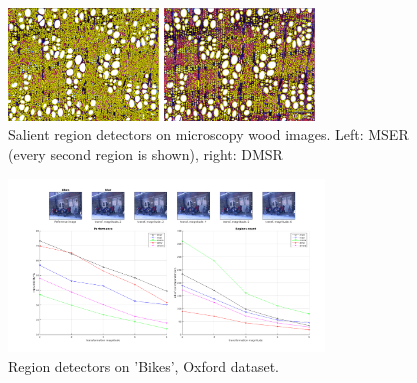 \documentclass{article}
\begin{document}
\begin{figure}[htb]

\begin{minipage}[b]{.49\linewidth}
  \centering
  \centerline{\includegraphics[width=4.0cm]{./Figs/mserWood}}
\end{minipage}
\hfill
\begin{minipage}[b]{0.49\linewidth}
  \centering
  \centerline{\includegraphics[width=4.0cm]{./Figs/dmsrWood}}
\end{minipage}
\caption{Salient region detectors on microscopy wood images. Left: MSER (every second region is shown), right: DMSR}
\label{fig:wood}
%
\end{figure}
\begin{figure}[htb]
\centering
\begin{minipage}[b]{.99\linewidth}
  \centering
  \centerline{\includegraphics[width=8.4cm]{./Figs/repeatability_all_affine_bikes_blur}}
\end{minipage}
\hfill
\caption{Region detectors on 'Bikes', Oxford dataset.}
\label{fig:det_bikes}
%
\end{figure}
\end{document}
